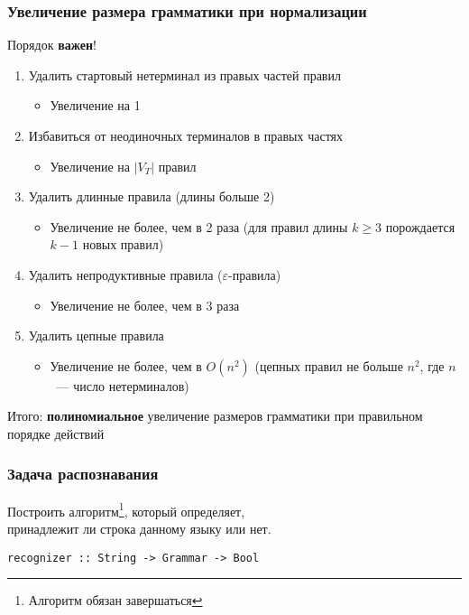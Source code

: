 \documentclass{beamer}
\begin{document}
\begin{frame}[fragile]
  \transwipe[direction=90]
  \frametitle{Увеличение размера грамматики при нормализации}

\begin{center}
    Порядок \textbf{важен}!
\end{center}

  \begin{enumerate}
    \item Удалить стартовый нетерминал из правых частей правил
    \begin{itemize}
      \item Увеличение на 1
    \end{itemize}
    \item Избавиться от неодиночных терминалов в правых частях
    \begin{itemize}
      \item Увеличение на $|V_T|$ правил
    \end{itemize}
    \item Удалить длинные правила (длины больше 2)
    \begin{itemize}
      \item Увеличение не более, чем в 2 раза (для правил длины $k \geq 3$ порождается $k-1$ новых правил)
    \end{itemize}
    \item Удалить непродуктивные правила ($\varepsilon$-правила)
    \begin{itemize}
      \item Увеличение не более, чем в 3 раза
    \end{itemize}
    \item Удалить цепные правила
    \begin{itemize}
      \item Увеличение не более, чем в $O(n^2)$ (цепных правил не больше $n^2$, где $n$~--- число нетерминалов)
    \end{itemize}
  \end{enumerate}

  Итого: \textbf{полиномиальное} увеличение размеров грамматики при правильном порядке действий
\end{frame}

\begin{frame}[fragile]
  \transwipe[direction=90]
  \frametitle{Задача распознавания}
\begin{center}
  Построить алгоритм\footnote[1]{Алгоритм обязан завершаться}, который определяет, \\ принадлежит ли строка данному языку или нет.
\end{center}

\vspace{0.6cm}

\begin{center}
\begin{minipage}{0.65\textwidth}
\begin{verbatim}
recognizer :: String -> Grammar -> Bool
\end{verbatim}
\end{minipage}
\end{center}

\end{frame}
\end{document}
